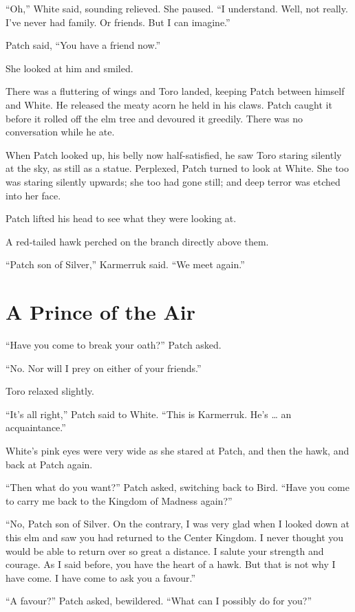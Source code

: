 \documentclass[12pt]{memoir}
\begin{document}
“Oh,” White said, sounding relieved. She paused. “I understand. Well,
not really. I’ve never had family. Or friends. But I can imagine.”

Patch said, “You have a friend now.”

She looked at him and smiled.

There was a fluttering of wings and Toro landed, keeping Patch between
himself and White. He released the meaty acorn he held in his
claws. Patch caught it before it rolled off the elm tree and devoured
it greedily. There was no conversation while he ate.

When Patch looked up, his belly now half-satisfied, he saw Toro
staring silently at the sky, as still as a statue. Perplexed, Patch
turned to look at White. She too was staring silently upwards; she too
had gone still; and deep terror was etched into her face.

Patch lifted his head to see what they were looking at.

A red-tailed hawk perched on the branch directly above them.

“Patch son of Silver,” Karmerruk said. “We meet again.”


\section{A Prince of the Air}

“Have you come to break your oath?” Patch asked.

“No. Nor will I prey on either of your friends.”

Toro relaxed slightly.

“It’s all right,” Patch said to White. “This is Karmerruk. He’s … an
acquaintance.”

White’s pink eyes were very wide as she stared at Patch, and then the
hawk, and back at Patch again.

“Then what do you want?” Patch asked, switching back to Bird. “Have
you come to carry me back to the Kingdom of Madness again?”

“No, Patch son of Silver. On the contrary, I was very glad when I
looked down at this elm and saw you had returned to the Center
Kingdom. I never thought you would be able to return over so great a
distance. I salute your strength and courage. As I said before, you
have the heart of a hawk. But that is not why I have come. I have come
to ask you a favour.”

“A favour?” Patch asked, bewildered. “What can I possibly do for you?”
\end{document}
